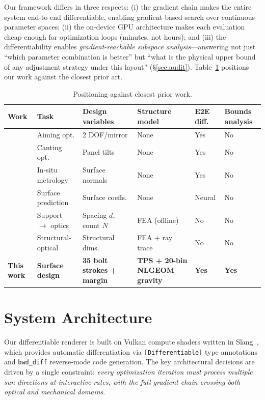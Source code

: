 \documentclass{CVM}
\begin{document}
Our framework differs in three respects: (i) the gradient chain makes the
entire system end-to-end differentiable, enabling gradient-based search over
continuous parameter spaces; (ii) the on-device GPU architecture makes each
evaluation cheap enough for optimization loops (minutes, not hours); and
(iii) the differentiability enables \emph{gradient-reachable subspace
analysis}---answering not just ``which parameter combination is better'' but
``what is the physical upper bound of any adjustment strategy under this
layout'' (\S\ref{sec:audit}). Table~\ref{tab:positioning} positions our work
against the closest prior art.

\begin{table}[t]
\centering
\caption{Positioning against closest prior work.}
\label{tab:positioning}
\small
\begin{tabular}{lp{2.2cm}p{2.5cm}p{2.2cm}p{1.6cm}p{1.8cm}}
\toprule
Work & Task & Design variables & Structure model & E2E diff. & Bounds analysis \\
\midrule
\cite{aiming2025} & Aiming opt. & 2 DOF/mirror & None & Yes & No \\
\cite{canting2025} & Canting opt. & Panel tilts & None & Yes & No \\
\cite{pargmann2024} & In-situ metrology & Surface normals & None & Yes & No \\
\cite{inverse2025a, inverse2025b} & Surface prediction & Surface coeffs. & None & Neural & No \\
\cite{yan2024,yan2025} & Support $\rightarrow$ optics & Spacing $d$, count $N$ & FEA (offline) & No & No \\
\cite{yang2022,thalange2017} & Structural-optical & Structural dims. & FEA + ray trace & No & No \\
\midrule
\textbf{This work} & \textbf{Surface design} & \textbf{35 bolt strokes + margin} & \textbf{TPS + 20-bin NLGEOM gravity} & \textbf{Yes} & \textbf{Yes} \\
\bottomrule
\end{tabular}
\end{table}

\section{System Architecture}
\label{sec:system}

Our differentiable renderer is built on Vulkan compute shaders written in
Slang~\cite{slang}, which provides automatic differentiation via
\verb|[Differentiable]| type annotations and \verb|bwd_diff| reverse-mode
code generation. The key architectural decisions are driven by a single
constraint: \emph{every optimization iteration must process multiple sun
directions at interactive rates, with the full gradient chain crossing both
optical and mechanical domains}.
\end{document}
